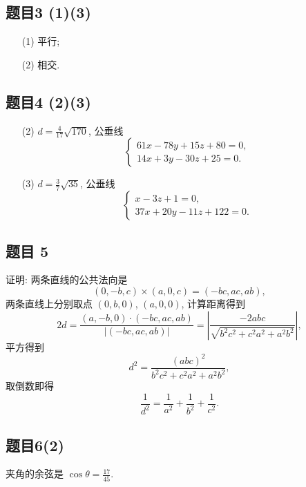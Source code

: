 \subsection*{ 题目3 (1)(3) }
\begin{solution}
\begin{enumerate}
    \item[(1)] 平行;
    \item[(2)] 相交.
\end{enumerate}
\end{solution}

\subsection*{ 题目4 (2)(3) }
\begin{solution}
\begin{enumerate}
    \item[(2)] $d = \frac{4}{17}\sqrt{170}$, 公垂线
    \[
    \begin{cases}
        61x - 78y + 15z + 80 = 0, \\
        14x + 3y - 30z + 25 = 0.
    \end{cases}
    \]
    \item[(3)] $d = \frac{3}{7}\sqrt{35}$, 公垂线
    \[
    \begin{cases}
        x - 3z + 1 = 0, \\
        37x + 20y - 11z + 122 = 0.
    \end{cases}
    \]
\end{enumerate}
\end{solution}

\subsection*{ 题目 5 }
\begin{solution}
证明: 两条直线的公共法向是
\[
(0, -b, c) \times (a, 0, c) = (-bc, ac, ab),
\]
两条直线上分别取点 $(0, b, 0)$, $(a, 0, 0)$, 计算距离得到
\[
2d = \frac{(a, -b, 0) \cdot (-bc, ac, ab)}{|(-bc, ac, ab)|} = |\frac{-2abc}{\sqrt{b^2c^2 + c^2a^2 + a^2b^2}}|,
\]
平方得到
\[
d^2 = \frac{(abc)^2}{b^2c^2 + c^2a^2 + a^2b^2},
\]
取倒数即得
\[
\frac{1}{d^2} = \frac{1}{a^2} + \frac{1}{b^2} + \frac{1}{c^2}.
\]
\end{solution}

\subsection*{ 题目6(2) }
\begin{solution}
夹角的余弦是  $\cos \theta = \frac{17}{45}$.
\end{solution}

